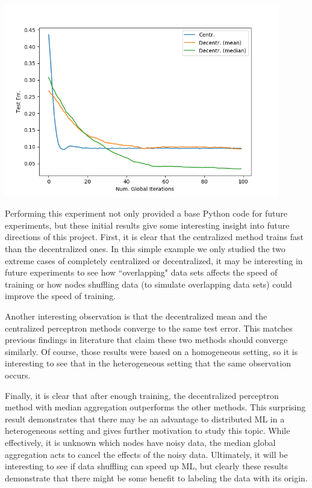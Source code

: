 \documentclass[11pt, fullpage,letterpaper]{article}
\begin{document}
\begin{enumerate}
\par{\hspace*{1cm}\includegraphics[width=12cm]{Figure_0.png}}

Performing this experiment not only provided a base Python code for future experiments, but these initial results give some interesting insight into future directions of this project. First, it is clear that the centralized method trains fast than the decentralized ones. In this simple example we only studied the two extreme cases of completely centralized or decentralized, it may be interesting in future experiments to see how ``overlapping" data sets affects the speed of training or how nodes shuffling data (to simulate overlapping data sets) could improve the speed of training.

Another interesting observation is that the decentralized mean and the centralized perceptron methods converge to the same test error. This matches previous findings in literature that claim these two methods should converge similarly. Of course, those results were based on a homogeneous setting, so it is interesting to see that in the heterogeneous setting that the same observation occurs.

Finally, it is clear that after enough training, the decentralized perceptron method with median aggregation outperforms the other methods. This surprising result demonstrates that there may be an advantage to distributed ML in a heterogeneous setting and gives further motivation to study this topic. While effectively, it is unknown which nodes have noisy data, the median global aggregation acts to cancel the effects of the noisy data. Ultimately, it will be interesting to see if data shuffling can speed up ML, but clearly these results demonstrate that there might be some benefit to labeling the data with its origin.



\end{enumerate}
\end{document}
